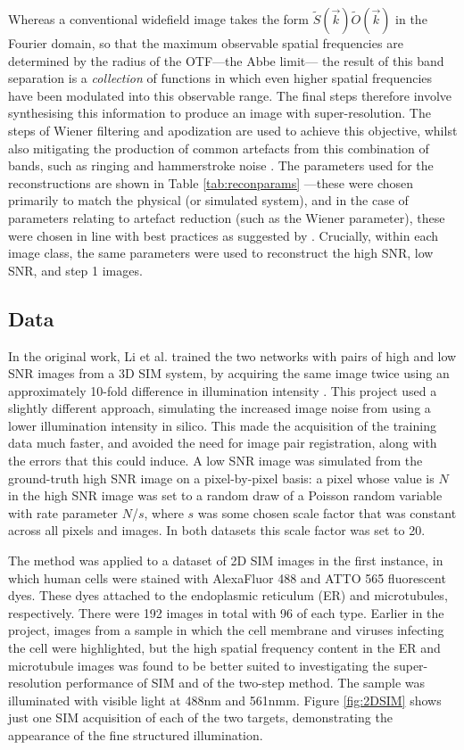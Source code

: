 \documentclass[12pt]{article}
\begin{document}
Whereas a conventional widefield image takes the form $\tilde{S}(\vec{k})\tilde{O}(\vec{k})$ in the Fourier domain,
so that the maximum observable spatial frequencies are determined by the radius of the OTF---the Abbe limit---
the result of this band separation is a \textit{collection} of functions in which even higher spatial frequencies have been modulated into this observable range.
The final steps therefore involve synthesising this information to produce an image with super-resolution.
The steps of Wiener filtering and apodization are used to achieve this objective,
whilst also mitigating the production of common artefacts from this combination of bands,
such as ringing and hammerstroke noise \cite{params}.
The parameters used for the reconstructions are shown in Table \ref{tab:reconparams}
---these were chosen primarily to match the physical (or simulated system),
and in the case of parameters relating to artefact reduction (such as the Wiener parameter),
these were chosen in line with best practices as suggested by \cite{params}.
Crucially, within each image class, the same parameters were used to reconstruct the high SNR, low SNR, and step 1 images.

\subsection{Data}

In the original work, Li et al. trained the two networks with pairs of high and low SNR images from a 3D SIM system,
by acquiring the same image twice using an approximately 10-fold difference in illumination intensity \cite{keypaper}.
This project used a slightly different approach,
simulating the increased image noise from using a lower illumination intensity in silico.
This made the acquisition of the training data much faster,
and avoided the need for image pair registration, along with the errors that this could induce.
A low SNR image was simulated from the ground-truth high SNR image on a pixel-by-pixel basis:
a pixel whose value is $N$ in the high SNR image was set to a random draw of a Poisson random variable with rate parameter $N$/$s$,
where $s$ was some chosen scale factor that was constant across all pixels and images.
In both datasets this scale factor was set to 20.

The method was applied to a dataset of 2D SIM images in the first instance,
in which human cells were stained with AlexaFluor 488 and ATTO 565 fluorescent dyes.
These dyes attached to the endoplasmic reticulum (ER) and microtubules, respectively.
There were 192 images in total with 96 of each type.
Earlier in the project, images from a sample in which the cell membrane and viruses infecting the cell were highlighted,
but the high spatial frequency content in the ER and microtubule images was found to be better suited to investigating the super-resolution performance of SIM and of the two-step method.
The sample was illuminated with visible light at 488nm and 561nmm.
Figure \ref{fig:2DSIM} shows just one SIM acquisition of each of the two targets,
demonstrating the appearance of the fine structured illumination.
\end{document}
